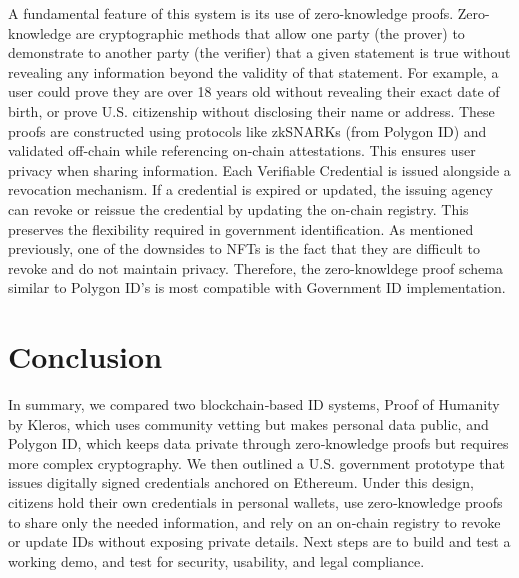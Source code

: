 \documentclass[conference]{IEEEtran}
\begin{document}
A fundamental feature of this system is its use of zero-knowledge proofs. Zero-knowledge are cryptographic methods that allow one party (the prover) to demonstrate to another party (the verifier) that a given statement is true without revealing any information beyond the validity of that statement. For example, a user could prove they are over 18 years old without revealing their exact date of birth, or prove U.S. citizenship without disclosing their name or address. These proofs are constructed using protocols like zkSNARKs (from Polygon ID) and validated off-chain while referencing on-chain attestations. This ensures user privacy when sharing information. Each Verifiable Credential is issued alongside a revocation mechanism. If a credential is expired or updated, the issuing agency can revoke or reissue the credential by updating the on-chain registry. This preserves the flexibility required in government identification. As mentioned previously, one of the downsides to NFTs is the fact that they are difficult to revoke and do not maintain privacy. Therefore, the zero-knowldege proof schema similar to Polygon ID's is most compatible with Government ID implementation.

\section{Conclusion}
In summary, we compared two blockchain‐based ID systems, Proof of Humanity by Kleros, which uses community vetting but makes personal data public, and Polygon ID, which keeps data private through zero‐knowledge proofs but requires more complex cryptography. We then outlined a U.S. government prototype that issues digitally signed credentials anchored on Ethereum. Under this design, citizens hold their own credentials in personal wallets, use zero‐knowledge proofs to share only the needed information, and rely on an on‐chain registry to revoke or update IDs without exposing private details. Next steps are to build and test a working demo, and test for security, usability, and legal compliance.
\end{document}
